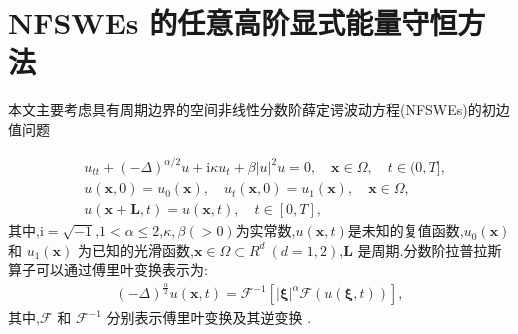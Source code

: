 \chapter[NFSWEs 的任意高阶显式能量守恒方法]{NFSWEs 的任意高阶显式能量守恒方法
}

本文主要考虑具有周期边界的空间非线性分数阶薛定谔波动方程(NFSWEs)的初边值问题

\begin{align}
&  u_{t t}+(-\Delta)^{\alpha / 2} u+\mathrm{i} \kappa u_{t}+\beta|u|^{2} u=0, \quad \boldsymbol{x} \in \Omega, \quad  t \in(0, T],\label{eq_SAVRRK:1}\\
& u(\boldsymbol{x}, 0)=u_{0}(\boldsymbol{x}), \quad u_{t}(\boldsymbol{x}, 0)=u_{1}(\boldsymbol{x}),\quad \boldsymbol{x} \in \Omega, \label{eq_SAVRRK:2}\\
& u(\boldsymbol{x}+\boldsymbol{L}, t)=u(\boldsymbol{x}, t), \quad t \in[0, T],\label{eq_SAVRRK:3}
\end{align}
其中,$\mathrm{i}=\sqrt{-1}$,$1<\alpha \leq 2$,$\kappa, \beta(>0)$为实常数,$u(\boldsymbol{x}, t)$是未知的复值函数,$u_{0}(\boldsymbol{x})$ 和 $u_{1}(\boldsymbol{x})$ 为已知的光滑函数,$\boldsymbol{x}\in\Omega\!\subset\!
R^d~(d\!=\!1,2)$,$\boldsymbol{L}$ 是周期.分数阶拉普拉斯算子可以通过傅里叶变换表示为:
\begin{align}\label{eq_SAVRRK:4}
(-\Delta)^{\frac{\alpha}{2}} u(\boldsymbol{x},t)=\mathcal{F}^{-1}\left[|\boldsymbol{\xi}|^{\alpha} \mathcal{F}(u(\boldsymbol{\xi},t))\right],
\end{align}
其中,$\mathcal{F}$ 和 $\mathcal{F}^{-1}$ 分别表示傅里叶变换及其逆变换 \cite{caffarelliExtensionProblemRelated2007}.


